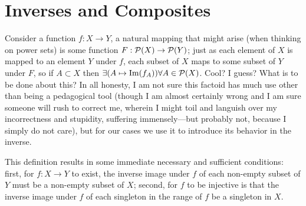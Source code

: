 \documentclass{report}
\begin{document}
\section{Inverses and Composites}

Consider a function \(f : X \to  Y\), a natural mapping that might arise (when thinking on power sets) is some function \(F : \mathcal{P} (X) \to  \mathcal{P}(Y)\); just as each element of \(X\) is mapped to an element \(Y\) under \(f\), each subset of \(X\) maps to some subset of \(Y\) under \(F\), so if \(A \subset  X\) then \(\exists (A \mapsto \operatorname{Im} (f_A)) \forall  A \in  \mathcal{P}(X)\). Cool? I guess? What is to be done about this? In all honesty, I am not sure this factoid has much use other than being a pedagogical tool (though I am almost certainly wrong and I am sure someone will rush to correct me, wherein I might toil and languish over my incorrectness and stupidity, suffering immensely---but probably not, because I simply do not care), but for our cases we use it to introduce its behavior in the inverse.


This definition results in some immediate necessary and sufficient conditions: first, for \(f : X \to Y\) to exist, the inverse
image under \(f\) of each non-empty subset of \(Y\) must be a non-empty subset of \(X\); second, for \(f\) to be injective is
that the inverse image under \(f\) of each singleton in the range of \(f\) be a singleton in \(X\).

\end{document}
